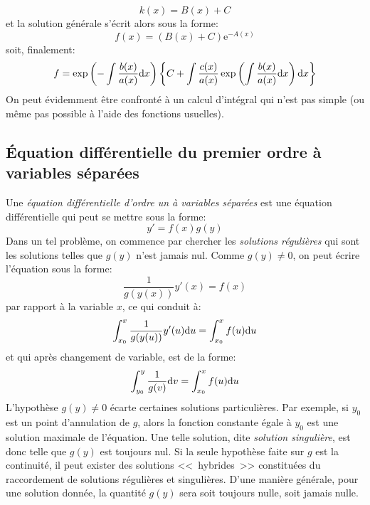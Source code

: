 \begin{equation}
k(x) = B(x) + C
\end{equation}
et la solution générale s'écrit alors sous la forme:
\begin{equation}
f(x) = (B(x) + C) \mathrm{e}^{-A(x)}
\end{equation}
soit, finalement:
\begin{equation}
f = \exp\left( -\int\frac{b(x)}{a(x)}\text{d} x  \right) \left\{ C + \int \frac{c(x)}{a(x)} \exp\left(\int \frac{b(x)}{a(x)}\text{d} x \right)\text{d} x  \right\}
\end{equation}
On peut évidemment être confronté à un calcul d'intégral qui n'est pas simple (ou même pas possible à l'aide des fonctions usuelles). 
 
\subsection{Équation différentielle du premier ordre à variables séparées} 
Une \emph{équation différentielle d'ordre un à variables séparées} est une équation différentielle qui peut se mettre sous la forme:
\begin{equation}
y' = f(x)g(y)
\end{equation}
Dans un tel problème, on commence par chercher les \emph{solutions régulières} qui sont les solutions telles que $g(y)$ n'est jamais nul. Comme $g(y)\ne0$, on peut écrire l'équation sous la forme:
\begin{equation}
\frac{1}{g(y(x))} y'(x) = f(x)
\end{equation}
par rapport à la variable $x$, ce qui conduit à:
\begin{equation}
\int_{x_0}^x \frac{1}{g(y(u))}y'(u) \text{d} u  = \int_{x_0}^x f(u) \text{d} u 
\end{equation}
et qui après changement de variable, est de la forme:
\begin{equation}
\int_{y_0}^y \frac{1}{g(v)} \text{d} v = \int_{x_0}^x f(u) \text{d} u 
\end{equation}
L'hypothèse $g(y)\ne0$ écarte certaines solutions particulières. Par exemple, si $y_0$ est un point d'annulation de $g$, alors la fonction constante égale à $y_0$ est une solution maximale de l'équation. Une telle solution, dite \emph{solution singulière}, est donc telle que $g(y)$ est toujours nul. Si la seule hypothèse faite sur $g$ est la continuité, il peut exister des solutions <<~hybrides~>> constituées du raccordement de solutions régulières et singulières. D'une manière générale, pour une solution donnée, la quantité $g(y)$ sera soit toujours nulle, soit jamais nulle. 

